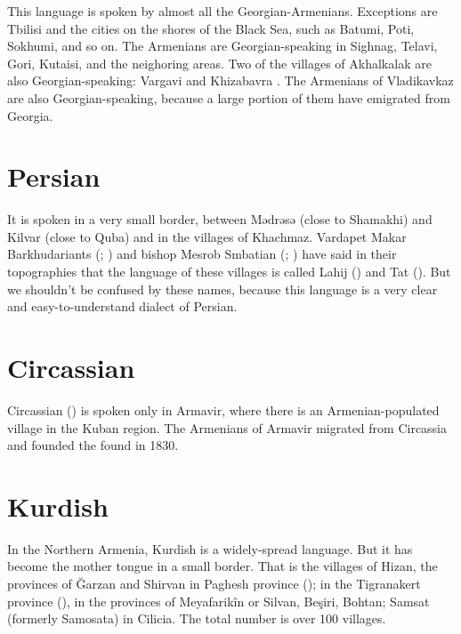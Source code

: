 This language is spoken by almost all the Georgian-Armenians. Exceptions are Tbilisi and the cities on the shores of the Black Sea, such as Batumi, Poti, Sokhumi, and so on. The Armenians are Georgian-speaking in Sighnag, Telavi, Gori, Kutaisi, and the neighoring areas. Two of the villages of Akhalkalak are also Georgian-speaking: Vargavi and Khizabavra . The Armenians of Vladikavkaz are also Georgian-speaking, because a large portion of them have emigrated from Georgia. 

\section{Persian}

It is spoken in a very small border, between Mədrəsə (close to Shamakhi) and Kilvar (close to Quba) and in the villages of Khachmaz. Vardapet Makar Barkhudariants (; ) and bishop Mesrob Smbatian (; ) have said in their topographies that the language of these villages is called Lahij () and Tat (). But we shouldn't be confused by these names, because this language is a very clear and easy-to-understand dialect of Persian.


\begin{adjarianpage}\label{page:33}\end{adjarianpage}%



\section{Circassian}

Circassian () is spoken only in Armavir, where there is an Armenian-populated village in the Kuban region. The Armenians of Armavir migrated from Circassia and founded the found in 1830.



\section{Kurdish}

In the Northern Armenia, Kurdish is a widely-spread language. But it has become the mother tongue in a small border. That is the villages of Hizan, the provinces of Ğarzan and Shirvan in Paghesh province (); in the Tigranakert province (), in the provinces of Meyafarikîn or Silvan, Beşiri, Bohtan; Samsat (formerly Samosata) in Cilicia. The total number is over 100 villages. 

